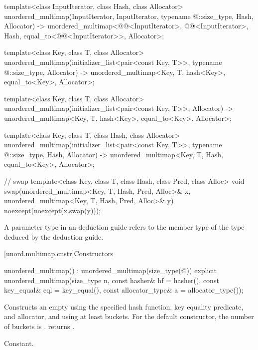 \begin{codeblock}
{  template<class InputIterator, class Hash, class Allocator>
    unordered_multimap(InputIterator, InputIterator, typename @\seebelow@::size_type, Hash,
                       Allocator)
      -> unordered_multimap<@@<InputIterator>, @@<InputIterator>, Hash,
                            equal_to<@@<InputIterator>>, Allocator>;

  template<class Key, class T, class Allocator>
    unordered_multimap(initializer_list<pair<const Key, T>>, typename @\seebelow@::size_type,
                       Allocator)
      -> unordered_multimap<Key, T, hash<Key>, equal_to<Key>, Allocator>;

  template<class Key, class T, class Allocator>
    unordered_multimap(initializer_list<pair<const Key, T>>, Allocator)
      -> unordered_multimap<Key, T, hash<Key>, equal_to<Key>, Allocator>;

  template<class Key, class T, class Hash, class Allocator>
    unordered_multimap(initializer_list<pair<const Key, T>>, typename @\seebelow@::size_type,
                       Hash, Allocator)
      -> unordered_multimap<Key, T, Hash, equal_to<Key>, Allocator>;

  // swap
  template<class Key, class T, class Hash, class Pred, class Alloc>
    void swap(unordered_multimap<Key, T, Hash, Pred, Alloc>& x,
              unordered_multimap<Key, T, Hash, Pred, Alloc>& y)
      noexcept(noexcept(x.swap(y)));
}
\end{codeblock}

\pnum
A  parameter type in an  deduction guide
refers to the  member type of the type deduced by the deduction guide.

[unord.multimap.cnstr]{Constructors}

%
\begin{itemdecl}
unordered_multimap() : unordered_multimap(size_type(@\seebelow@)) { }
explicit unordered_multimap(size_type n,
                            const hasher& hf = hasher(),
                            const key_equal& eql = key_equal(),
                            const allocator_type& a = allocator_type());
\end{itemdecl}

\begin{itemdescr}
\pnum
\effects Constructs an empty  using the
specified hash function, key equality predicate, and allocator, and
using at least  buckets.  For the default constructor,
the number of buckets is .
 returns .

\pnum
\complexity Constant.
\end{itemdescr}

